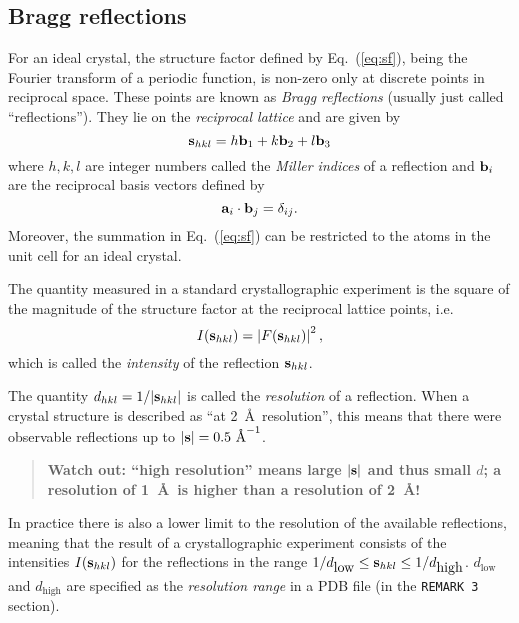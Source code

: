 \documentclass[11pt]{article}
\newcommand{\vect}[1]{{\bf #1}}
\newcommand{\va}{\vect{a}}
\newcommand{\vb}{\vect{b}}
\newcommand{\vs}{\vect{s}}
\begin{document}
\begin{sloppy}
\subsection{Bragg reflections}

For an ideal crystal, the structure factor defined by
Eq.~(\ref{eq:sf}), being the Fourier transform of a periodic function,
is non-zero only at discrete points in reciprocal space. These points
are known as \textit{Bragg reflections} (usually just called
``reflections''). They lie on the \textit{reciprocal lattice} and are
given by
\begin{equation}
\vs_{hkl} = h \vb_1 + k \vb_2 + l \vb_3
\end{equation}
where $h, k, l$ are integer numbers called the \textit{Miller indices}
of a reflection and $\vb_i$ are the reciprocal basis vectors defined by
\begin{equation}
\va_i \cdot \vb_j = \delta_{ij}.
\end{equation}
Moreover, the summation in Eq.~(\ref{eq:sf}) can be restricted to the
atoms in the unit cell for an ideal crystal.

The quantity measured in a standard crystallographic experiment is the
square of the magnitude of the structure factor at the reciprocal
lattice points, i.e.
\begin{equation}
I(\vs_{hkl}) = \left| F(\vs_{hkl}) \right|^2,
\end{equation}
which is called the \textit{intensity} of the reflection $\vs_{hkl}$.

The quantity $d_{hkl}=1/|\vs_{hkl}|$ is called the \textit{resolution}
of a reflection. When a crystal structure is described as ``at 2~\AA\ 
resolution'', this means that there were observable reflections up to
$|\vs|=0.5 \mbox{ \AA}^{-1}$.
\begin{quote}
\textbf{Watch out: ``high resolution'' means large $|\vs|$ and thus small $d$;
a resolution of 1~\AA\ is higher than a resolution of 2~\AA!}
\end{quote}

In practice there is also a lower limit to the resolution of the
available reflections, meaning that the result of a crystallographic
experiment consists of the intensities $I(\vs_{hkl})$ for the
reflections in the range $1/d_{\mbox{low}} \leq \vs_{hkl} \leq
1/d_{\mbox{high}}$. $d_{\mbox{low}}$ and $d_{\mbox{high}}$ are
specified as the \textit{resolution range} in a PDB file (in the
\texttt{REMARK   3} section).


\end{sloppy}
\end{document}
